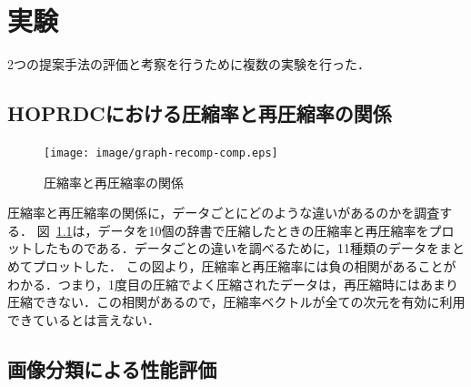 \chapter{実験}
2つの提案手法の評価と考察を行うために複数の実験を行った．

\section{HOPRDCにおける圧縮率と再圧縮率の関係} %
\label{sec:hoprdcにおける圧縮率と再圧縮率の関係}
\begin{figure}[tb]
\begin{center}
\texttt{[image: image/graph-recomp-comp.eps]}
\caption{圧縮率と再圧縮率の関係}
\label{fig:image/graph-recomp-comp}
\end{center}
\end{figure}

圧縮率と再圧縮率の関係に，データごとにどのような違いがあるのかを調査する．
図~\ref{fig:image/graph-recomp-comp}は，データを10個の辞書で圧縮したときの圧縮率と再圧縮率をプロットしたものである．データごとの違いを調べるために，11種類のデータをまとめてプロットした．
この図より，圧縮率と再圧縮率には負の相関があることがわかる．つまり，1度目の圧縮でよく圧縮されたデータは，再圧縮時にはあまり圧縮できない．この相関があるので，圧縮率ベクトルが全ての次元を有効に利用できているとは言えない．

\section{画像分類による性能評価}
